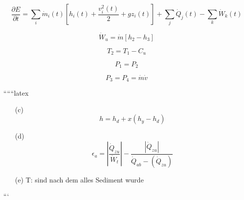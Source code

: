 \begin{equation*}
\frac{\partial E}{\partial t} = \sum_i \dot{m}_i(t) \left[ h_i(t) + \frac{v_i^2(t)}{2} + g z_i(t) \right] + \sum_j \dot{Q}_j(t) - \sum_k \dot{W}_k(t)
\end{equation*}

\begin{equation*}
\dot{W}_u = \dot{m} \left[ h_2 - h_3 \right]
\end{equation*}

\begin{equation*}
T_2 = T_1 - C_u
\end{equation*}

\begin{equation*}
P_1 = P_2
\end{equation*}

\begin{equation*}
P_3 = P_4 = \dot{m} \dot{v}
\end{equation*}

``````latex


\begin{enumerate}
    \item[(c)] 
    \[
    h = h_d + x \left( h_y - h_d \right)
    \]

    \item[(d)] 
    \[
    \epsilon_a = \left| \frac{\dot{Q}_{zu}}{\dot{W}_t} \right| - \frac{\left| \dot{Q}_{zu} \right|}{\dot{Q}_{ab} - \left( \dot{Q}_{zu} \right)}
    \]

    \item[(e)] 
    T: sind nach dem alles Sediment wurde
\end{enumerate}

```